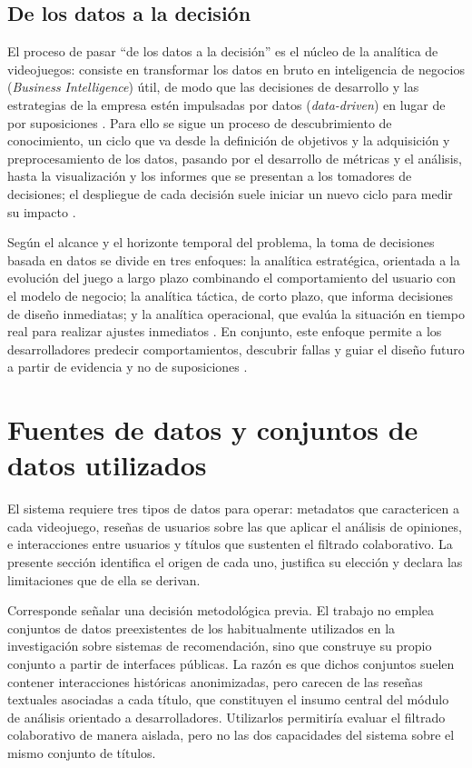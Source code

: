 \subsection{De los datos a la decisión}\label{subsec:datos_decision}

El proceso de pasar \enquote{de los datos a la decisión} es el núcleo de la analítica de videojuegos: consiste en transformar los datos en bruto en inteligencia de negocios (\emph{Business Intelligence}) útil, de modo que las decisiones de desarrollo y las estrategias de la empresa estén impulsadas por datos (\emph{data-driven}) en lugar de por suposiciones \parencite{DrachenEtAl2011}. Para ello se sigue un proceso de descubrimiento de conocimiento, un ciclo que va desde la definición de objetivos y la adquisición y preprocesamiento de los datos, pasando por el desarrollo de métricas y el análisis, hasta la visualización y los informes que se presentan a los tomadores de decisiones; el despliegue de cada decisión suele iniciar un nuevo ciclo para medir su impacto \parencite{DrachenEtAl2011}.

Según el alcance y el horizonte temporal del problema, la toma de decisiones basada en datos se divide en tres enfoques: la analítica estratégica, orientada a la evolución del juego a largo plazo combinando el comportamiento del usuario con el modelo de negocio; la analítica táctica, de corto plazo, que informa decisiones de diseño inmediatas; y la analítica operacional, que evalúa la situación en tiempo real para realizar ajustes inmediatos \parencite{DrachenEtAl2011}. En conjunto, este enfoque permite a los desarrolladores predecir comportamientos, descubrir fallas y guiar el diseño futuro a partir de evidencia y no de suposiciones \parencite{DrachenEtAl2011}.

\section{Fuentes de datos y conjuntos de datos utilizados}\label{sec:fuentes_datos}

El sistema requiere tres tipos de datos para operar: metadatos que caractericen a cada videojuego, reseñas de usuarios sobre las que aplicar el análisis de opiniones, e interacciones entre usuarios y títulos que sustenten el filtrado colaborativo. La presente sección identifica el origen de cada uno, justifica su elección y declara las limitaciones que de ella se derivan.

Corresponde señalar una decisión metodológica previa. El trabajo no emplea conjuntos de datos preexistentes de los habitualmente utilizados en la investigación sobre sistemas de recomendación, sino que construye su propio conjunto a partir de interfaces públicas. La razón es que dichos conjuntos suelen contener interacciones históricas anonimizadas, pero carecen de las reseñas textuales asociadas a cada título, que constituyen el insumo central del módulo de análisis orientado a desarrolladores. Utilizarlos permitiría evaluar el filtrado colaborativo de manera aislada, pero no las dos capacidades del sistema sobre el mismo conjunto de títulos.

